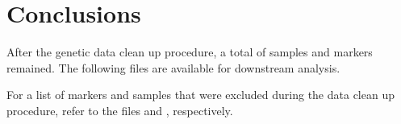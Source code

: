 \documentclass[10pt,twoside,english]{scrartcl}
\let\tempone\itemize
\let\temptwo\enditemize
\renewenvironment{itemize}{\tempone\setlength{\itemsep}{0pt}}{\temptwo}
\begin{document}
\clearpage

\section{Conclusions}
After the genetic data clean up procedure, a total of 
samples and  markers remained. The following files are
available for downstream analysis.

\begin{itemize}
\item {}
\end{itemize}

For a list of markers and samples that were excluded during the data clean up
procedure, refer to the files  and
, respectively.

\begin{thebibliography}{9}
\end{thebibliography}
\end{document}
